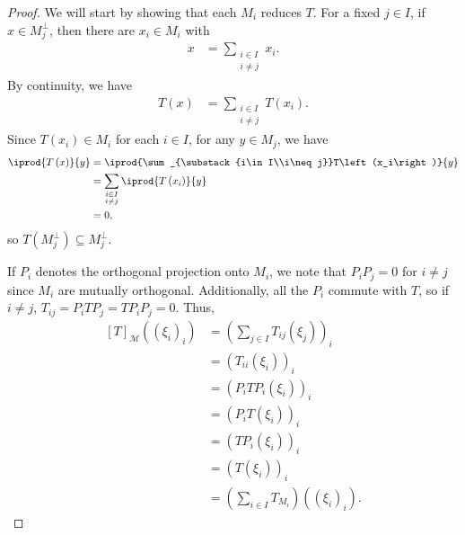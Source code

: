 \documentclass[10pt]{mypackage}
\begin{document}
\begin{proof}
  We will start by showing that each $M_i$ reduces $T$. For a fixed $j\in I$, if $x\in M_j^{\perp}$, then there are $x_i\in M_i$ with
  \begin{align*}
    x &= \sum_{\substack{i\in I\\i\neq j}}x_i.
  \end{align*}
  By continuity, we have
  \begin{align*}
    T\left(x\right) &= \sum_{\substack{i\in I\\i\neq j}}T\left(x_i\right).
  \end{align*}
  Since $T\left(x_i\right)\in M_i$ for each $i\in I$, for any $y\in M_j$, we have
  \begin{align*}
    \iprod{T\left(x\right)}{y} &= \iprod{\sum_{\substack{i\in I\\i\neq j}}T\left(x_i\right)}{y}\\
                               &= \sum_{\substack{i\in I\\i\neq j}} \iprod{T\left(x_i\right)}{y}\\
                               &= 0,
  \end{align*}
  so $T\left(M_{j}^{\perp}\right)\subseteq M_{j}^{\perp}$.\newline

  If $P_i$ denotes the orthogonal projection onto $M_i$, we note that $P_iP_j = 0$ for $i\neq j$ since $M_i$ are mutually orthogonal. Additionally, all the $P_i$ commute with $T$, so if $i\neq j$, $T_{ij} = P_iTP_j = TP_iP_j = 0$. Thus,
  \begin{align*}
    \left[T\right]_{\mathcal{M}}\left(\left(\xi_i\right)_i\right) &= \left(\sum_{j\in I}T_{ij}\left(\xi_j\right)\right)_i\\
                                                                  &= \left(T_{ii}\left(\xi_i\right)\right)_i\\
                                                                  &= \left(P_iTP_i\left(\xi_i\right)\right)_i\\
                                                                  &= \left(P_iT\left(\xi_i\right)\right)_i\\
                                                                  &= \left(TP_i\left(\xi_i\right)\right)_i\\
                                                                  &= \left(T\left(\xi_i\right)\right)_i\\
                                                                  &= \left(\sum_{i\in I}T_{M_i}\right)\left(\left(\xi_i\right)_i\right).
  \end{align*}
\end{proof}
\end{document}
